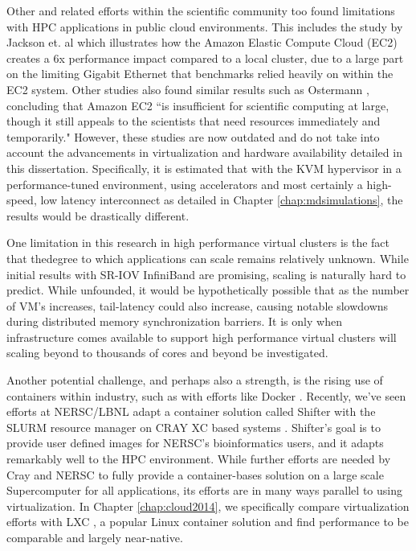 Other and related efforts within the scientific community too found limitations with HPC applications in public cloud environments. This includes the study by Jackson et. al \cite{jackson2010performance} which illustrates how the Amazon Elastic Compute Cloud (EC2) creates a 6x performance impact compared to a local cluster, due to a large part on the limiting Gigabit Ethernet that benchmarks relied heavily on within the EC2 system. Other studies also found similar results such as Ostermann \cite{ostermann2009performance}, concluding that Amazon EC2 ``is insufficient for scientific computing at large, though it still appeals to the scientists that need resources immediately and temporarily."  However, these studies are now outdated and do not take into account the advancements in virtualization and hardware availability detailed in this dissertation. Specifically, it is estimated that with the KVM hypervisor in a performance-tuned environment, using accelerators and most certainly a high-speed, low latency interconnect as detailed in Chapter \ref{chap:mdsimulations}, the results would be drastically different. 


One limitation in this research in high performance virtual clusters is the fact that thedegree to which applications can scale remains relatively unknown. While initial results with SR-IOV InfiniBand are promising, scaling is naturally hard to predict. While unfounded, it would be hypothetically possible that as the number of VM's increases, tail-latency could also increase, causing notable slowdowns during distributed memory synchronization barriers. It is only when infrastructure comes available to support high performance virtual clusters will scaling beyond to thousands of cores and beyond be investigated.  

Another potential challenge, and perhaps also a strength, is the rising use of containers within industry, such as with efforts like Docker \cite{merkel2014docker}. Recently, we've seen efforts at NERSC/LBNL adapt a container solution called Shifter with the SLURM resource manager on CRAY XC based systems \cite{jacobsen2015contain}. Shifter's goal is to provide user defined images for NERSC's bioinformatics users, and it adapts remarkably well to the HPC environment. While further efforts are needed by Cray and NERSC to fully provide a container-bases solution on a large scale Supercomputer for all applications, its efforts are in many ways parallel to using virtualization. In Chapter \ref{chap:cloud2014}, we specifically compare virtualization efforts with LXC \cite{xavier2013performance}, a popular Linux container solution and find performance to be comparable and largely near-native. 


